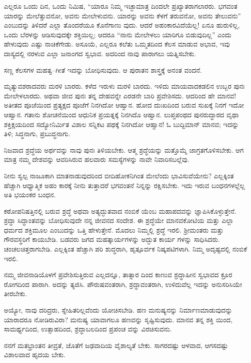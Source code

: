 ಎಲ್ಲರೂ ಒಂದು ದಿನ, ಒಂದು ನಿಮಿಷ, “ಯಾರೂ ನಿಮ್ಮ ಇಚ್ಛಾಮಾತ್ರ ದಿಂದಲೇ ಪ್ರಖ್ಯಾತರಾಗಲಾರರು. ಭಗವಂತ ಯಾರನ್ನು ಮೇಲೆತ್ತುವನೋ, ಅವನು ಮೇಲೇಳುವನು. ಯಾರನ್ನು ಅವನು ಕೆಳಗೆ ತರುವನೋ, ಅವನು ತೇಲುವನು” ಎಂಬುದನ್ನು ತಿಳಿದರೆ ಎಲ್ಲಾ ತೊಂದರೆಯೂ ಕೊನೆಗಾಣು ವುದು. ಆದರೆ ಅಹಂಕಾರವಿದೆಯೆಲ್ಲ! ಏನೂ ಹುರುಳಿಲ್ಲ, ಒಂದು ಬೆರಳನ್ನು ಆಡಿಸುವುದಕ್ಕೇ ಶಕ್ತಿಯಿಲ್ಲ; ಆದರೂ “ನಾನು ಮೇಲೇಳಲು ಯಾರಿಗೂ ಬಿಡುವುದಿಲ್ಲ” ಎಂದು ಹೇಳುವುದು ಎಷ್ಟು ನಾಚಿಕೆಗೇಡು. ಅಸೂಯೆ, ಎಲ್ಲರೂ ಕಲೆತು ಒಮ್ಮತದಿಂದ ಕೆಲಸ ಮಾಡುವ ಅಭಾವ, ಇವು ದಾಸ್ಯದಲ್ಲಿ ನರಳುವ ಎಲ್ಲಾ ಜನಾಂಗದ ಸ್ವಭಾವ. ಅದರಿಂದ ನಾವು ಪಾರಾಗಲು ಯತ್ನಿಸಬೇಕು.

ಸಣ್ಣ ಕೆಲಸಗಳ ಮಹತ್ವ–ಗೀತೆ ಇದನ್ನು ಬೋಧಿಸುವುದು. ಆ ಪುರಾತನ ಶಾಸ್ತ್ರಕ್ಕೆ ಅನಂತ ವಂದನೆ.

ಮೃತ್ಯುವಶರಾದವರು ಮರಳಿ ಬಾರರು. ಕಳೆದ ಇರುಳು ಮರಳಿ ಬಾರದು. ಇಳಿದು ಮಾಯವಾದಕಡಲಿನ ಉಬ್ಬರ ಪುನಃ ಮೇಲೇಳಲಾರದು. ಅಥವಾ ಜೀವ ಪುನಃ ತನ್ನ ದೇಹವನ್ನೇ ಎರಡನೇ ಬಾರಿ ಪ್ರವೇಶಿಸದು. ಆದರಿಂದ ಹೇ ಮಾನವ! ಅತೀತದ ಪೂಜೆಯಿಂದ ಪ್ರತ್ಯಕ್ಷದ ಪೂಜೆಗೆ ನಿನಗಿದೋ ಆಹ್ವಾನ. ಹೋದ ದುಃಖದಿಂದ ಬರುವ ಸುಖಕ್ಕೆ ನಿನಗೆ ಇದೋ ಆಹ್ವಾನ. ಗತಾನು ಶೋಚನೆಯಿಂದ ಆಧುನಿಕ ಪ್ರಯತ್ನಕ್ಕೆ ನಿನಗಿದೊ ಆಹ್ವಾನ. ಲುಪ್ತಪಂಥದ ಪುನರುದ್ಧಾರದ ವೃಥಾ ಶಕ್ತಿಕ್ಷಯದಿಂದ ಸದ್ಯೋನಿರ್ಮಿತ ವಿಶಾಲ ಸನ್ನಿಕಟ ಪಥಕ್ಕೆ ನಿನಗಿದೋ ಆಹ್ವಾನ! ಓ ಬುದ್ದಿಮಾನ್ ಮಾನವ; ಇದನ್ನು ತಿಳಿ; ಸಿದ್ಧನಾಗು, ಪ್ರಬುದ್ಧನಾಗು.

ನಿಜವಾದ ಶ್ರದ್ಧೆಯ ಅರ್ಥವನ್ನು ನಾವು ಪುನಃ ತಿಳಿಯಬೇಕು. ಆತ್ಮ ಶ್ರದ್ಧೆಯನ್ನು ಮತ್ತೊಮ್ಮೆ ಜಾಗ್ರತಗೊಳಿಸಬೇಕು. ಆಗ ಮಾತ್ರ ನಮ್ಮ ದೇಶವನ್ನು ಆವರಿಸಿರುವ ಹಲವಾರು ಸಮಸ್ಯೆಗಳನ್ನು ನಾವೇ ನಿವಾರಿಸಬಲ್ಲೆವು.

ನೀನು ಸ್ವಲ್ಪ ನಾಜೂಕಾಗಿ ಮಾತನಾಡುವುದರಿಂದ ಬೀದಿಹೋಕನಿಗಿಂತ ಮೇಲೆಂದು ಭಾವಿಸುವೆಯೇನು? ಎಲ್ಲಕ್ಕಿಂತ ಹೆಚ್ಚಾಗಿ ಆಧ್ಯಾತ್ಮಿಕ ಅಹಂ ಕಾರಕ್ಕೆ ನೀನು ತುತ್ತಾದರೆ ಭಗವಂತನೆ ನಿನ್ನನ್ನು ರಕ್ಷಿಸಬೇಕು. ಇದು ಇರುವ ಬಂಧನಗಳಲ್ಲೆಲ್ಲ ಅತಿ ಭಯಂಕರ ಬಂಧನ.

ಕಠೋಪನಿಷತ್ತಿನಲ್ಲಿ ಬರುವ ಶ್ರದ್ಧೆ ಅಥವಾ ಅತ್ಯದ್ಭುತವಾದ ನಂಬಿಕೆ ಯೆಂಬ ಮಹಾಪದವನ್ನು ಜ್ಞಾಪಿಸಿಕೊಳ್ಳುತ್ತೇನೆ. ಶ್ರದ್ಧಾ ಸಿದ್ಧಾಂತವನ್ನು ಬೋಧಿಸುವುದೇ ನನ್ನ ಜೀವನದ ಸಂದೇಶ. ಈ ಶ್ರದ್ಧೆಯೇ ಮಾನವಕೋಟಿಯ ಮತ್ತು ಎಲ್ಲಾ ಧರ್ಮದ ಶಕ್ತಿಮೂಲ ಎಂಬುದನ್ನು ಒತ್ತಿ ಹೇಳುತ್ತೇನೆ. ಮೊದಲು ನಿಮ್ಮಲ್ಲಿ ಶ್ರದ್ಧೆ ಇರಲಿ. ಶ್ರೀಮಂತರು ಮತ್ತು ಗೌರವಸ್ಥರಿಗೆ ಕಾಯಬೇಡಿ. ಬಡವರು ಜಗದ ಮಹತ್ಕಾರ್ಯಗಳನ್ನು ಅದ್ಭುತ ಕಾರ್ಯ ಗಳನ್ನು ಸಾಧಿಸಿದರು. ಚಂಚಲಚಿತ್ತರಾಗಬೇಡಿ. ಎಲ್ಲಕ್ಕಿಂತ ಹೆಚ್ಚಾಗಿ ಪರಿ ಶುದ್ಧರಾಗಿ, ಹೃತ್ಪೂರ್ವಕ ನಿಷ್ಕಪಟಿಗಳಾಗಿ. ನಿಮ್ಮ ಅದೃಷ್ಟದಲ್ಲಿ ನಂಬಿಕೆ ಇರಲಿ.

ನಮ್ಮ ಜೀವನಾಡಿಯೊಳಗೆ ಪ್ರವೇಶಿಸುತ್ತಿರುವ ಎಲ್ಲದನ್ನೂ, ತಾತ್ಸಾರ ದಿಂದ ಕಾಣುವ ಶ್ರದ್ಧಾಹೀನ ಸ್ವಭಾವದ ಕ್ರೂರ ರೋಗದಿಂದ ಪಾರಾಗಿ. ಅದನ್ನು ತ್ಯಜಿಸಿ. ಪೌರುಷವಂತರಾಗಿ, ಶ್ರದ್ಧಾವಂತರಾಗಿ, ಉಳಿದುವೆಲ್ಲ ಇದನ್ನು ಅನುಸರಿಸಿಯೇ ತೀರಬೇಕು.

ಅಯ್ಯೋ, ನಾವು ದರಿದ್ರರು, ಸ್ನೇಹಿತರಿಲ್ಲವೆಂದು ಯೋಚಿಸಬೇಡಿ. ಹಣ ಮನುಷ್ಯನನ್ನು ನಿರ್ಮಾಣಮಾಡುವುದನ್ನು ಯಾರಾದರೂ ನೋಡಿರುವಿರಾ? ಮನುಷ್ಯ ಯಾವಾಗಲೂ ಹಣವನ್ನು ಸೃಷ್ಟಿಸುವುದು. ಮಾನವ ತನ್ನ ಶಕ್ತಿ ಯಿಂದ, ಸಾಮರ್ಥ್ಯದಿಂದ, ಉತ್ಸಾಹದಿಂದ, ಶ್ರದ್ಧಾಬಲದಿಂದ ಪ್ರಪಂಚ ವನ್ನು ವಿರಚಿಸುವನು.

ನನಗೆ ಮತಭ್ರಾಂತನ ತೀವ್ರತೆ, ಜೊತೆಗೆ ಜಢವಾದಿಯ ವೈಶಾಲ್ಯತೆ ಬೇಕು. ಸಾಗರದಷ್ಟು ಆಳವಾದ, ಆಗಸದಷ್ಟು ವಿಶಾಲವಾದ ಹೃದಯ ಬೇಕು.

